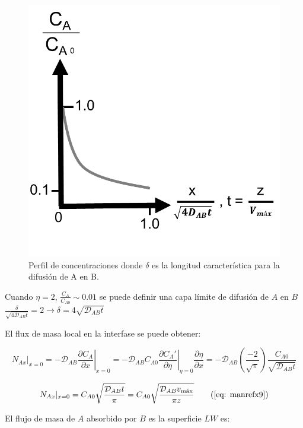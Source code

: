  \begin{figure}[H]
 	\centering
 	\includegraphics[scale=0.3]{./Capitulo2/Imagenes/fig-2-5.PNG}
 	\caption{Perfil de concentraciones donde $\delta$ es la longitud característica para la difusión de A en B.}
 \end{figure}
 
 Cuando $\eta = 2$, $\frac{C_A}{C_{A0}} \sim 0.01$ se puede definir una capa límite de difusión de $A$ en $B$ $\frac{\delta}{\sqrt{4\mathcal{D}_{AB}t}} = 2 \to \delta = 4 \sqrt{\mathcal{D}_{AB}t}$
 
 El flux de masa local en la interfase se puede obtener:
 
 $$N_{Ax}|_{x=0} = -\mathcal{D}_{AB} \left. \frac{\partial C_A}{\partial x} \right|_{x=0} = -\mathcal{D}_{AB} C_{A0} \left. \frac{\partial C_A'}{\partial \eta} \right| _{\eta = 0} \frac{\partial \eta}{\partial x} = -\mathcal{D}_{AB} \left( \frac{-2}{\sqrt{\pi}} \right) \frac{C_{A0}}{\sqrt{\mathcal{D}_{AB}t}}$$
 
 \begin{equation}
 	N_{Ax}|_{x=0} = C_{A0} \sqrt{\frac{\mathcal{D}_{AB}t}{\pi}} = C_{A0} \sqrt{ \frac{\mathcal{D}_{AB} v_{\text{máx}}}{\pi z}}
 	\tag{\ref{eq: manrefx9}}
 \end{equation}
 
 El flujo de masa de $A$ absorbido por $B$ es la superficie $LW$ es:
 
